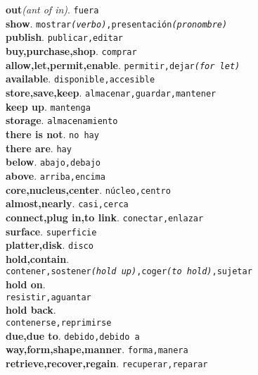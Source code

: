 \documentclass[twocolumn]{article}
\begin{document}
	\textsf{\textbf{out}}{\scriptsize \textsl{(ant of in)}}. \texttt{fuera}\\
	\textsf{\textbf{show}}. \texttt{mostrar{\scriptsize \textsl{(verbo)}},presentaci\'on{\scriptsize \textsl{(pronombre)}}}\\
	\textsf{\textbf{publish}}. \texttt{publicar,editar}\\
	\textsf{\textbf{buy,purchase,shop}}. \texttt{comprar}\\
	\textsf{\textbf{allow,let,permit,enable}}. \texttt{permitir,dejar{\scriptsize \textsl{(for let)}}}\\
	\textsf{\textbf{available}}. \texttt{disponible,accesible}\\
	\textsf{\textbf{store,save,keep}}. \texttt{almacenar,guardar,mantener}\\
	\textsf{\textbf{keep up}}. \texttt{mantenga}\\
	\textsf{\textbf{storage}}. \texttt{almacenamiento}\\
	\textsf{\textbf{there is not}}. \texttt{no hay}\\
	\textsf{\textbf{there are}}. \texttt{hay}\\
	\textsf{\textbf{below}}. \texttt{abajo,debajo}\\
	\textsf{\textbf{above}}. \texttt{arriba,encima}\\
	\textsf{\textbf{core,nucleus,center}}. \texttt{n\'ucleo,centro}\\
	\textsf{\textbf{almost,nearly}}. \texttt{casi,cerca}\\
	\textsf{\textbf{connect,plug in,to link}}. \texttt{conectar,enlazar}\\
	\textsf{\textbf{surface}}. \texttt{superficie}\\
	\textsf{\textbf{platter,disk}}. \texttt{disco}\\
	\textsf{\textbf{hold,contain}}.\\\texttt{contener,sostener{\scriptsize \textsl{(hold up)}},coger{\scriptsize \textsl{(to hold)}},sujetar}\\
	\textsf{\textbf{hold on}}.\\\texttt{resistir,aguantar}\\
	\textsf{\textbf{hold back}}.\\\texttt{contenerse,reprimirse}\\
	\textsf{\textbf{due,due to}}. \texttt{debido,debido a}\\
	\textsf{\textbf{way,form,shape,manner}}. \texttt{forma,manera}\\
	\textsf{\textbf{retrieve,recover,regain}}. \texttt{recuperar,reparar}\\
\end{document}
